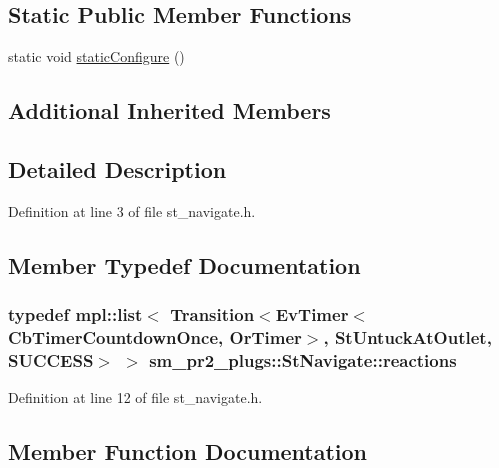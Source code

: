 \subsection*{Static Public Member Functions}
\begin{DoxyCompactItemize}
\item 
static void \hyperlink{structsm__pr2__plugs_1_1StNavigate_a052e5c763e3e8d487f3dcaa2a9a2fab0}{static\+Configure} ()
\end{DoxyCompactItemize}
\subsection*{Additional Inherited Members}


\subsection{Detailed Description}


Definition at line 3 of file st\+\_\+navigate.\+h.



\subsection{Member Typedef Documentation}
\subsubsection[{\texorpdfstring{reactions}{reactions}}]{\setlength{\rightskip}{0pt plus 5cm}typedef mpl\+::list$<$ Transition$<$Ev\+Timer$<$Cb\+Timer\+Countdown\+Once, {\bf Or\+Timer}$>$, {\bf St\+Untuck\+At\+Outlet}, {\bf S\+U\+C\+C\+E\+SS}$>$ $>$ {\bf sm\+\_\+pr2\+\_\+plugs\+::\+St\+Navigate\+::reactions}}\hypertarget{structsm__pr2__plugs_1_1StNavigate_a11299afba109067d019e8526f10f2286}{}\label{structsm__pr2__plugs_1_1StNavigate_a11299afba109067d019e8526f10f2286}


Definition at line 12 of file st\+\_\+navigate.\+h.



\subsection{Member Function Documentation}

